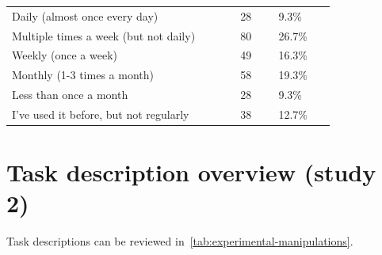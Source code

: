 \begin{table}[]
\begin{tabular}{p{0.6\linewidth} p{0.1\linewidth} p{0.15\linewidth}}
        \hspace{3mm} Daily (almost once every day)& 28& 9.3\%\\
        \hspace{3mm} Multiple times a week (but not daily)& 80& 26.7\%\\
        \hspace{3mm} Weekly (once a week)& 49& 16.3\%\\
        \hspace{3mm} Monthly (1-3 times a month)& 58& 19.3\%\\
        \hspace{3mm} Less than once a month& 28& 9.3\%\\
        \hspace{3mm} I've used it before, but not regularly& 38& 12.7\%\\
    \bottomrule
    \end{tabular}
    \label{tab:demographics-statistics}
\end{table}

\section{Task description overview (study 2)}
\label{sec: appendix-scenario-description}
Task descriptions can be reviewed in~\autoref{tab:experimental-manipulations}.


